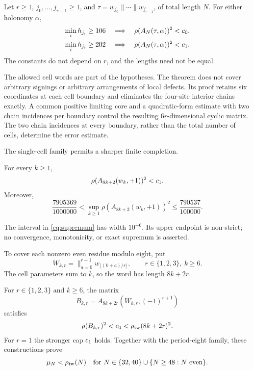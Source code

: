 \begin{theorem}\label{thm:cells}
Let $r\ge1$, $j_0,\ldots,j_{r-1}\ge1$, and
$\tau=w_{j_0}\|\cdots\|w_{j_{r-1}}$, of total length $N$.
For either holonomy $\alpha$,
\begin{align}
 \min_i h_{j_i}\ge106&\quad\Longrightarrow\quad
       \rho(A_N(\tau,\alpha))^2<c_0,\label{eq:cell-cap0}\\
 \min_i h_{j_i}\ge202&\quad\Longrightarrow\quad
       \rho(A_N(\tau,\alpha))^2<c_1.\label{eq:cell-cap1}
\end{align}
The constants do not depend on $r$, and the lengths need not be equal.
\end{theorem}

The allowed cell words are part of the hypotheses. The theorem does not
cover arbitrary signings or arbitrary arrangements of local defects.
Its proof retains six coordinates at each cell boundary and eliminates the
four-site interior chains exactly. A common positive limiting core and a
quadratic-form estimate with two chain incidences per boundary control the
resulting $6r$-dimensional cyclic matrix. The two chain incidences at every boundary, rather than the total number
of cells, determine the error estimate.

The single-cell family permits a sharper finite completion.
\begin{theorem}\label{thm:one-cell}
For every $k\ge1$,
\[
 \rho(A_{8k+2}(w_k,+1))^2<c_1.
\]
Moreover,
\begin{equation}
 \frac{7905369}{1000000}
 <\sup_{k\ge1}\rho(A_{8k+2}(w_k,+1))^2
 \le\frac{790537}{100000}.
 \label{eq:supremum}
\end{equation}
\end{theorem}
The interval in \eqref{eq:supremum} has width $10^{-6}$. Its upper endpoint
is non-strict; no convergence, monotonicity, or exact supremum is asserted.

To cover each nonzero even residue modulo eight, put
\[
 W_{k,r}=\mathop{\|}_{a=0}^{r-1}w_{\lfloor(k+a)/r\rfloor},
 \qquad r\in\{1,2,3\},\ k\ge6.
\]
The cell parameters sum to $k$, so the word has length $8k+2r$.
\begin{theorem}\label{thm:witnesses}
For $r\in\{1,2,3\}$ and $k\ge6$, the matrix
\[
 B_{k,r}=A_{8k+2r}(W_{k,r},(-1)^{r+1})
\]
satisfies
\begin{equation}
 \rho(B_{k,r})^2<c_0<\rho_{\mathrm{tw}}(8k+2r)^2.
 \label{eq:nonzero-witnesses}
\end{equation}
For $r=1$ the stronger cap $c_1$ holds. Together with the period-eight
family, these constructions prove
\[
 \mu_N<\rho_{\mathrm{tw}}(N)
 \quad\text{for }N\in\{32,40\}\cup\{N\ge48:N\text{ even}\}.
\]
\end{theorem}

